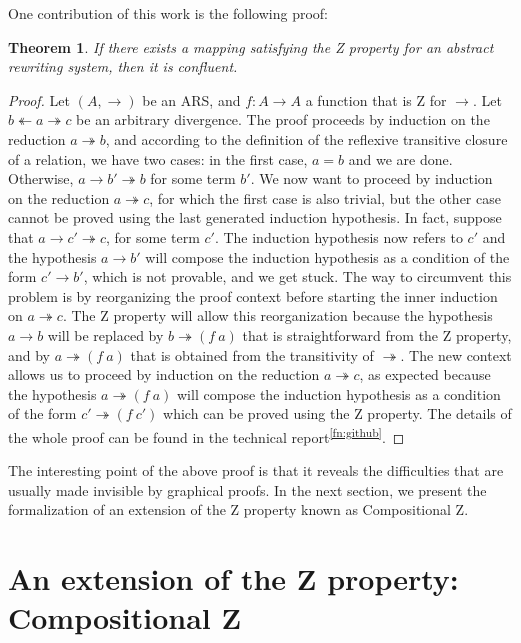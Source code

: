 \documentclass[a4paper]{article}
\newcommand{\tto}{\twoheadrightarrow}
\newcommand{\ott}{\twoheadleftarrow}
\newtheorem{theorem}{Theorem}[section]
\begin{document}
One contribution of this work is the following proof:
\begin{theorem}\cite{dehornoy2008z}
  If there exists a mapping satisfying the Z property for an abstract
  rewriting system, then it is confluent.
\end{theorem}
\begin{proof}
  Let $(A,\to)$ be an ARS, and $f: A \to A$ a function that is Z for
  $\to$. Let $b \ott a \tto c$ be an arbitrary divergence. The proof
  proceeds by induction on the reduction $a \tto b$, and according to
  the definition of the reflexive transitive closure of a relation, we
  have two cases: in the first case, $a=b$ and we are done. Otherwise,
  $a \to b' \tto b$ for some term $b'$. We now want to proceed by
  induction on the reduction $a \tto c$, for which the first case is
  also trivial, but the other case cannot be proved using the last
  generated induction hypothesis. In fact, suppose that
  $a \to c' \tto c$, for some term $c'$. The induction hypothesis now
  refers to $c'$ and the hypothesis $a \to b'$ will compose the
  induction hypothesis as a condition of the form $c' \to b'$, which
  is not provable, and we get stuck. The way to circumvent this
  problem is by reorganizing the proof context before starting the
  inner induction on $a \tto c$. The Z property will allow this
  reorganization because the hypothesis $a \to b$ will be replaced by
  $b \tto (f\ a)$ that is straightforward from the Z property, and by
  $a \tto (f\ a)$ that is obtained from the transitivity of
  $\tto$. The new context allows us to proceed by induction on the
  reduction $a \tto c$, as expected because the hypothesis
  $a \tto (f\ a)$ will compose the induction hypothesis as a condition
  of the form $c' \tto (f\ c')$ which can be proved using the Z
  property. The details of the whole proof can be found in the
  technical report\textsuperscript{\ref{fn:github}}.
\end{proof}
  
The interesting point of the above proof is that it reveals the difficulties that are usually made invisible by graphical proofs. In the next section, we present the formalization of an extension of the Z property known as Compositional Z.

\section{An extension of the Z property: Compositional Z}
\end{document}
